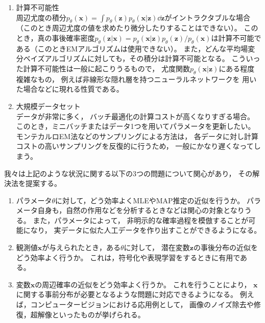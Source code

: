 \documentclass[dvipdfmx, fleqn, draft]{jsarticle}
\begin{document}
\begin{enumerate}
    \item 計算不可能性 \\
        周辺尤度の積分\(p_{\theta} (\bm{x}) = \int p_{\theta} (\bm{z}) p_{\theta} (\bm{x}|\bm{z}) \dd\bm{z}\)がイントラクタブルな場合（このとき周辺尤度の値を求めたり微分したりすることはできない）。
        このとき，真の事後確率密度\(p_\theta (\bm{z}|\bm{x}) = p_{\theta} (\bm{x}|\bm{z}) p_{\theta} (\bm{z}) / p_{\theta} (\bm{x})\)は計算不可能である（このときEMアルゴリズムは使用できない）。
        また，どんな平均場変分ベイズアルゴリズムに対しても，その積分は計算不可能となる。
        こういった計算不可能性は一般に起こりうるもので，
        尤度関数\(p_{\theta} (\bm{x}|\bm{z})\)にある程度複雑なもの，
        例えば非線形な隠れ層を持つニューラルネットワークを
        用いた場合などに現れる性質である。
    \item 大規模データセット \\
        データが非常に多く，
        バッチ最適化の計算コストが高くなりすぎる場合。
        このとき，ミニバッチまたはデータ1つを用いてパラメータを更新したい。
        モンテカルロEM法などのサンプリングによる方法は，
        各データに対し計算コストの高いサンプリングを反復的に行うため，
        一般にかなり遅くなってしまう。
\end{enumerate}

我々は上記のような状況に関する以下の3つの問題について関心があり，
その解決法を提案する。

\begin{enumerate}
    \item
        パラメータ\(\theta\)に対して，どう効率よくMLEやMAP推定の近似を行うか。
        パラメータ自身も，自然の作用などを分析するときなどは関心の対象となりうる。
        また，パラメータによって，
        非明示的な確率過程を模倣することが可能になり，
        実データに似た人工データを作り出すことができるようになる。
    \item
        観測値\(\bm{x}\)が与えられたとき，ある\(\theta\)に対して，
        潜在変数\(\bm{z}\)の事後分布の近似をどう効率よく行うか。
        これは，符号化や表現学習をするときに有用である。
    \item
        変数\(\bm{x}\)の周辺確率の近似をどう効率よく行うか。
        これを行うことにより，
        \(\bm{x}\)に関する事前分布が必要となるような問題に対応できるようになる。
        例えば，コンピュータービジョンにおける応用例として，
        画像のノイズ除去や修復，超解像といったものが挙げられる。
\end{enumerate}
\end{document}
